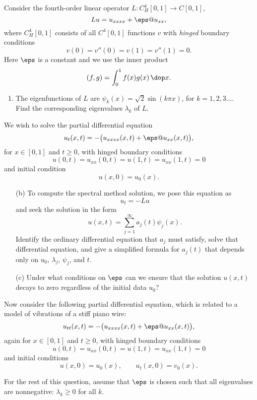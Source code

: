 Consider the fourth-order linear operator $L: C^4_H[0,1] \to C[0,1]$,
\[ L u = u_{xxxx} + \eps @ u_{xx},\]
where $C^4_H[0,1]$ consists of all $C^4[0,1]$ functions $v$ with 
\emph{hinged} boundary conditions
\[ v(0)= v''(0) = v(1) = v''(1) = 0.\]
Here $\eps$ is a constant and we use the inner product
\[ (f,g) = \int_0^1 f(x) g(x)\, \dop x.\]

\begin{enumerate}
\item The eigenfunctions of $L$ are 
$\psi_k(x) = \sqrt{2} \sin(k\pi x)$, for $k=1,2,3\ldots.$\\
  Find the corresponding eigenvalues $\lambda_k$ of $L$.
\end{enumerate}

\vspace*{1em}
We wish to solve the partial differential equation
\[ u_{t}(x,t) = -\big(u_{xxxx}(x,t)+\eps@u_{xx}(x,t)\big),\]
for $x\in[0,1]$ and $t\ge 0$, with hinged boundary conditions
\[ u(0,t)= u_{xx}(0,t) = u(1,t) = u_{xx}(1,t) = 0\]
and initial condition
\[ u(x,0) = u_0(x).\]

\vspace*{1em}
 
\begin{enumerate}
\item[(b)] To compute the spectral method solution, 
we pose this equation as
\[ u_t = - L u \] 
and seek the solution in the form
\[ u(x,t) = \sum_{j=1}^\infty a_j(t) \psi_j(x).\]
Identify the ordinary differential equation that $a_j$ must satisfy,
solve that differential equation, and give a simplified formula for
$a_j(t)$ that depends only on $u_0$, $\lambda_j$, $\psi_j$, and $t$.

\vspace*{1em}
\item[(c)] Under what conditions on $\eps$ can we ensure that the
solution $u(x,t)$ decays to zero regardless of the initial data $u_0$?
\end{enumerate}

Now consider the following partial differential equation,
which is related to a model of vibrations of a stiff piano wire:
\[ u_{tt}(x,t) = -\big(u_{xxxx}(x,t)+\eps@u_{xx}(x,t)\big),\]
again for $x\in[0,1]$ and $t\ge 0$, with hinged boundary conditions
\[ u(0,t)= u_{xx}(0,t) = u(1,t) = u_{xx}(1,t) = 0\]
and initial conditions
\[ u(x,0) = u_0(x), \qquad 
   u_t(x,0) = v_0(x).\]

\vspace*{1em}
For the rest of this question, assume that $\eps$ is chosen such
that all eigenvalues are nonnegative: $\lambda_k\ge 0$ for all $k$.

